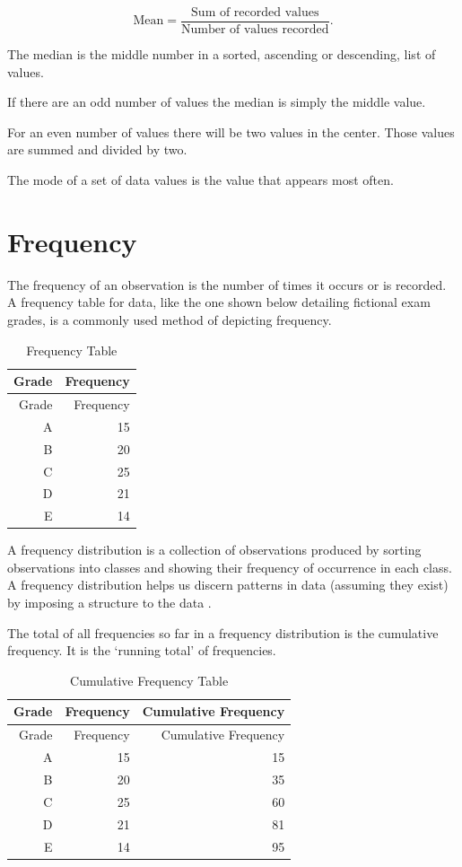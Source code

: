 \documentclass[
]{book}
\begin{document}
\[ \textrm{Mean} = \frac{\textrm{Sum of recorded values}}{\textrm{Number of values recorded}}.\]

The median is the middle number in a sorted, ascending or descending, list of values.

If there are an odd number of values the median is simply the middle value.

For an even number of values there will be two values in the center. Those values are summed and divided by two.

The mode of a set of data values is the value that appears most often.

\hypertarget{frequency}{%
\section{Frequency}\label{frequency}}

The frequency of an observation is the number of times it occurs or is recorded. A frequency table for data, like the one shown below detailing fictional exam grades, is a commonly used method of depicting frequency.

\begin{longtable}[]{@{}rr@{}}
\caption{\label{tab:table5} Frequency Table}\tabularnewline
\toprule
Grade & Frequency \\
\midrule
\endfirsthead
\toprule
Grade & Frequency \\
\midrule
\endhead
A & 15 \\
B & 20 \\
C & 25 \\
D & 21 \\
E & 14 \\
\bottomrule
\end{longtable}

A frequency distribution is a collection of observations produced by sorting observations into classes and showing their frequency of occurrence in each class. A frequency distribution helps us discern patterns in data (assuming they exist) by imposing a structure to the data \citep{Witte2017}.

The total of all frequencies so far in a frequency distribution is the cumulative frequency. It is the `running total' of frequencies.

\begin{longtable}[]{@{}rrr@{}}
\caption{\label{tab:table6} Cumulative Frequency Table}\tabularnewline
\toprule
Grade & Frequency & Cumulative Frequency \\
\midrule
\endfirsthead
\toprule
Grade & Frequency & Cumulative Frequency \\
\midrule
\endhead
A & 15 & 15 \\
B & 20 & 35 \\
C & 25 & 60 \\
D & 21 & 81 \\
E & 14 & 95 \\
\bottomrule
\end{longtable}
\end{document}
